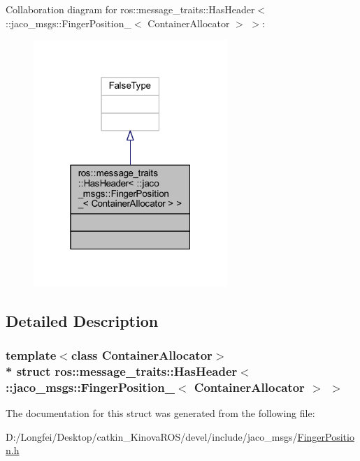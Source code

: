 Collaboration diagram for ros\+:\+:message\+\_\+traits\+:\+:Has\+Header$<$ \+:\+:jaco\+\_\+msgs\+:\+:Finger\+Position\+\_\+$<$ Container\+Allocator $>$ $>$\+:
\nopagebreak
\begin{figure}[H]
\begin{center}
\leavevmode
\includegraphics[width=208pt]{d2/df0/structros_1_1message__traits_1_1HasHeader_3_01_1_1jaco__msgs_1_1FingerPosition___3_01ContainerAllocator_01_4_01_4__coll__graph}
\end{center}
\end{figure}


\subsection{Detailed Description}
\subsubsection*{template$<$class Container\+Allocator$>$\\*
struct ros\+::message\+\_\+traits\+::\+Has\+Header$<$ \+::jaco\+\_\+msgs\+::\+Finger\+Position\+\_\+$<$ Container\+Allocator $>$ $>$}



The documentation for this struct was generated from the following file\+:\begin{DoxyCompactItemize}
\item 
D\+:/\+Longfei/\+Desktop/catkin\+\_\+\+Kinova\+R\+O\+S/devel/include/jaco\+\_\+msgs/\hyperlink{FingerPosition_8h}{Finger\+Position.\+h}\end{DoxyCompactItemize}
